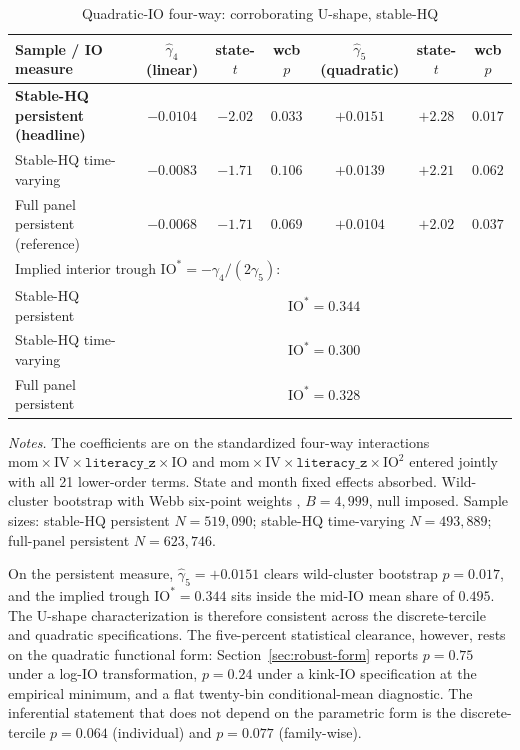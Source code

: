 \begin{table}[t]
\centering
\caption{Quadratic-IO four-way: corroborating U-shape, stable-HQ}
\label{tab:headline_quadratic}
\footnotesize
\begin{minipage}{\textwidth}
\centering
\begin{tabular}{lcccccc}
\toprule
Sample / IO measure & $\hat\gamma_{4}$ (linear) & state-$t$ & wcb $p$ & $\hat\gamma_{5}$ (quadratic) & state-$t$ & wcb $p$ \\
\midrule
\textbf{Stable-HQ persistent (headline)} & $\mathbf{-0.0104}$ & $\mathbf{-2.02}$ & $\mathbf{0.033}$ & $\mathbf{+0.0151}$ & $\mathbf{+2.28}$ & $\mathbf{0.017}$ \\
Stable-HQ time-varying                   & $-0.0083$ & $-1.71$ & $0.106$ & $+0.0139$ & $+2.21$ & $0.062$ \\
Full panel persistent (reference)        & $-0.0068$ & $-1.71$ & $0.069$ & $+0.0104$ & $+2.02$ & $0.037$ \\
\midrule
\multicolumn{7}{l}{Implied interior trough $\mathrm{IO}^{\ast} = -\gamma_{4}/(2\gamma_{5})$:} \\
Stable-HQ persistent & \multicolumn{6}{c}{$\mathrm{IO}^{\ast} = 0.344$} \\
Stable-HQ time-varying & \multicolumn{6}{c}{$\mathrm{IO}^{\ast} = 0.300$} \\
Full panel persistent & \multicolumn{6}{c}{$\mathrm{IO}^{\ast} = 0.328$} \\
\bottomrule
\end{tabular}
\end{minipage}

\medskip
{\footnotesize\textit{Notes.} The coefficients are on the standardized four-way interactions $\mathrm{mom}\times\mathrm{IV}\times\mathtt{literacy\_z}\times\mathrm{IO}$ and $\mathrm{mom}\times\mathrm{IV}\times\mathtt{literacy\_z}\times\mathrm{IO}^{2}$ entered jointly with all 21 lower-order terms. State and month fixed effects absorbed. Wild-cluster bootstrap with Webb six-point weights \citep{webb2014, cameronGelbachMiller2008}, $B = 4{,}999$, null imposed. Sample sizes: stable-HQ persistent $N = 519{,}090$; stable-HQ time-varying $N = 493{,}889$; full-panel persistent $N = 623{,}746$.}
\end{table}

On the persistent measure, $\hat\gamma_{5} = +0.0151$ clears wild-cluster bootstrap $p = 0.017$, and the implied trough $\mathrm{IO}^{\ast} = 0.344$ sits inside the mid-IO mean share of $0.495$. The U-shape characterization is therefore consistent across the discrete-tercile and quadratic specifications. The five-percent statistical clearance, however, rests on the quadratic functional form: Section~\ref{sec:robust-form} reports $p = 0.75$ under a log-IO transformation, $p = 0.24$ under a kink-IO specification at the empirical minimum, and a flat twenty-bin conditional-mean diagnostic. The inferential statement that does not depend on the parametric form is the discrete-tercile $p = 0.064$ (individual) and $p = 0.077$ (family-wise).

